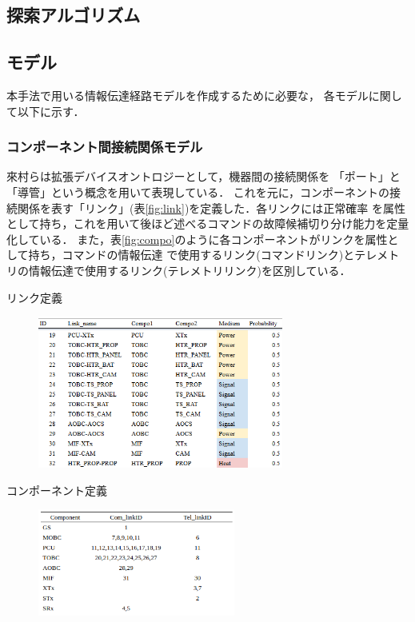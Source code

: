 \documentclass[11pt]{jsarticle}%
\begin{document}
\begin{multicols}{2}
\subsection{探索アルゴリズム}

\subsection{モデル}%
本手法で用いる情報伝達経路モデルを作成するために必要な，
各モデルに関して以下に示す．
\vspace{-1zh}
\subsubsection{コンポーネント間接続関係モデル}
來村ら\cite{Kitamura01}は拡張デバイスオントロジーとして，機器間の接続関係を
「ポート」と「導管」という概念を用いて表現している．
これを元に，コンポーネントの接続関係を表す「リンク」(表\ref{fig:link})を定義した．各リンクには正常確率
を属性として持ち，これを用いて後ほど述べるコマンドの故障候補切り分け能力を定量化している．
また，表\ref{fig:compo}のように各コンポーネントがリンクを属性として持ち，コマンドの情報伝達
で使用するリンク(コマンドリンク)とテレメトリの情報伝達で使用するリンク(テレメトリリンク)を区別している．
\begin{table}[H]
  \centering
  \caption{リンク定義}
  \label{fig:link}
\end{table}
\vspace{-3zh}
\begin{figure}[H]
  \centering
    \includegraphics[height=5.0cm]{../figure/link_definition_resume.png}
\end{figure}
\vspace{-2zh}

\begin{table}[H]
  \centering
  \caption{コンポーネント定義}
  \label{fig:compo}
\end{table}
\vspace{-3zh}
\begin{figure}[H]
  \centering
    \includegraphics[height=3.5cm]{../figure/compo_link_resume.png}
\end{figure}


\end{multicols}
\end{document}
